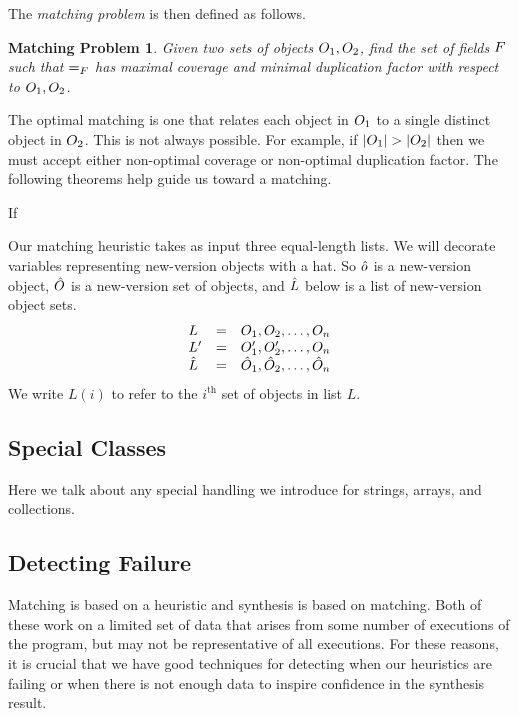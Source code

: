 The \emph{matching problem} is then defined as follows.
\newtheorem*{mprob}{Matching Problem}
\begin{mprob}
Given two sets of objects $O_1, O_2$, find the set of
fields $F$ such that $=_{F}$ has maximal coverage and
minimal duplication factor with respect to $O_1, O_2$.
\end{mprob}

The optimal matching is one that relates each object in $O_1$ to
a single distinct object in $O_2$.  This is not always possible.
For example, if $\lvert O_1 \rvert > \lvert O_2 \rvert$ then we
must accept either non-optimal coverage or non-optimal duplication
factor.  The following theorems help guide us toward a matching.

\begin{thm}
If 
\end{thm}

Our matching heuristic takes as input three equal-length lists.  We
will decorate variables representing new-version objects with a hat.
So $\hat{o}$ is a new-version object, $\hat{O}$ is a new-version set of
objects, and $\hat{L}$ below is a list of new-version object sets.
\[
\begin{array}{lcl}
L &=& O_1, O_2, \ldots, O_n \\
L' &=& O_1', O_2', \ldots, O_n \\
\hat{L} &=& \hat{O}_1, \hat{O}_2, \ldots, \hat{O}_n
\end{array}
\]
We write $L(i)$ to refer to the $i^{\text{th}}$ set of objects in list $L$.


\subsection{Special Classes}

Here we talk about any special handling we introduce for strings,
arrays, and collections.

\subsection{Detecting Failure}

Matching is based on a heuristic and synthesis is based on matching.
Both of these work on a limited set of data that arises from some
number of executions of the program, but may not be representative of
all executions.  For these reasons, it is crucial that we have good
techniques for detecting when our heuristics are failing or when there
is not enough data to inspire confidence in the synthesis result.

